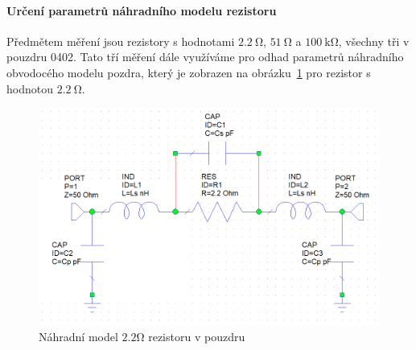 \documentclass[11pt,a4paper]{article}
\newcommand{\Ohm}{\mathrm{\Omega}}
\newcommand{\kOhm}{\mathrm{k\Omega}}
\begin{document}
\paragraph*{Určení parametrů náhradního modelu rezistoru} Předmětem měření jsou rezistory s hodnotami $2.2\ \Ohm$, $51\ \Ohm$ a $100\ \kOhm$, všechny tři v pouzdru 0402. Tato tří měření dále využíváme pro odhad parametrů náhradního obvodocého modelu pozdra, který je zobrazen na obrázku~\ref{fig:nahradni-model-pouzdra} pro rezistor s hodnotou $2.2\ \Ohm$.
\begin{figure}[!ht]
    \centering
    \includegraphics[width=.6\textwidth]{src/nahradni-model-pouzdra.png}
    \caption{\label{fig:nahradni-model-pouzdra}Náhradní model $2.2\Ohm$ rezistoru v pouzdru}
\end{figure}
\end{document}
